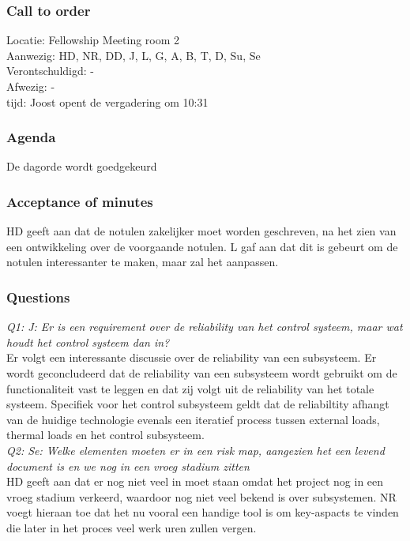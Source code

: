 \subsubsection{Call to order}
Locatie: Fellowship Meeting room 2\\
Aanwezig: HD, NR, DD, J, L, G, A, B, T, D, Su, Se\\
Verontschuldigd: - \\
Afwezig: - \\
tijd: Joost opent de vergadering om 10:31\\

\subsubsection{Agenda}
De dagorde wordt goedgekeurd\\

\subsubsection{Acceptance of minutes}
HD geeft aan dat de notulen zakelijker moet worden geschreven, na het zien van een ontwikkeling over de voorgaande notulen. L gaf aan dat dit is gebeurt om de notulen interessanter te maken, maar zal het aanpassen.\\

\subsubsection{Questions}
\textit{Q1: J: Er is een requirement over de reliability van het control systeem, maar wat houdt het control systeem dan in?}\\
Er volgt een interessante discussie over de reliability van een subsysteem. Er wordt geconcludeerd dat de reliability van een subsysteem wordt gebruikt om de functionaliteit vast te leggen en dat zij volgt uit de reliability van het totale systeem. Specifiek voor het control subsysteem geldt dat de reliabiltity afhangt van de huidige technologie evenals een iteratief process tussen external loads, thermal loads en het control subsysteem.\\

\textit{Q2: Se: Welke elementen moeten er in een risk map, aangezien het een levend document is en we nog in een vroeg stadium zitten}\\
HD geeft aan dat er nog niet veel in moet staan omdat het project nog in een vroeg stadium verkeerd, waardoor nog niet veel bekend is over subsystemen. NR voegt hieraan toe dat het nu vooral een handige tool is om key-aspacts te vinden die later in het proces veel werk uren zullen vergen.\\

